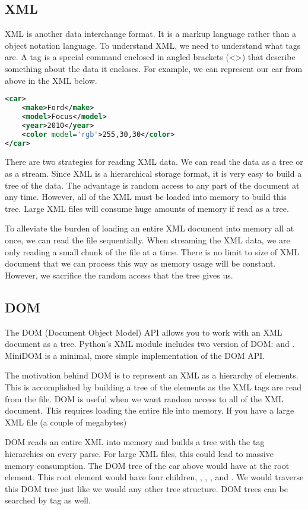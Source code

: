 \subsection*{XML}
XML is another data interchange format.  It is a markup language rather than a object notation language.
To understand XML, we need to understand what tags are.
A tag is a special command enclosed in angled brackets (<>) that describe something about the data it encloses.
For example, we can represent our car from above in the XML below.
\begin{lstlisting}[language=XML]
<car>
    <make>Ford</make>
    <model>Focus</model>
    <year>2010</year>
    <color model='rgb'>255,30,30</color>
</car>
\end{lstlisting}
There are two strategies for reading XML data.
We can read the data as a tree or as a stream.
Since XML is a hierarchical storage format, it is very easy to build a tree of the data.
The advantage is random access to any part of the document at any time.
However, all of the XML must be loaded into memory to build this tree.
Large XML files will consume huge amounts of memory if read as a tree.

To alleviate the burden of loading an entire XML document into memory all at once, we can read the file sequentially.
When streaming the XML data, we are only reading a small chunk of the file at a time.
There is no limit to size of XML document that we can process this way as memory usage will be constant.
However, we sacrifice the random access that the tree gives us.

\subsection*{DOM}
The DOM (Document Object Model) API allows you to work with an XML document as a tree.
Python's XML module includes two version of DOM:  and .
MiniDOM is a minimal, more simple implementation of the DOM API.

The motivation behind DOM is to represent an XML as a hierarchy of elements.
This is accomplished by building a tree of the elements as the XML tags are read from the file.
DOM is useful when we want random access to all of the XML document.
This requires loading the entire file into memory.
If you have a large XML file (a couple of megabytes)

DOM reads an entire XML into memory and builds a tree with the tag hierarchies on every parse.
For large XML files, this could lead to massive memory consumption.
The DOM tree of the car above would have  at the root element.
This root element would have four children, , , , and .
We would traverse this DOM tree just like we would any other tree structure.
DOM trees can be searched by tag as well.

